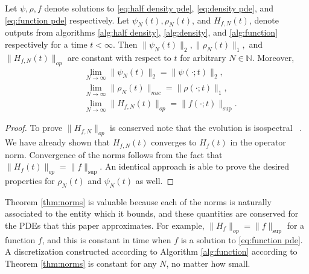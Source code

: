 \documentclass[final,leqno]{siamart}
\begin{document}
\begin{theorem} \label{thm:norms}
	Let $\psi,\rho,f$ denote solutions to \eqref{eq:half density pde}, \eqref{eq:density pde}, and \eqref{eq:function pde} respectively.
	Let $\psi_{N}(t),\rho_{N}(t)$, and $H_{f,N}(t)$, denote outputs from algorithms \ref{alg:half density}, \ref{alg:density}, and \ref{alg:function} respectively for a time $t < \infty$.
	Then $\| \psi_{N} (t)\|_{2}, \|\rho_{N}(t)\|_{1},$ and $\| H_{f,N}(t) \|_{op}$ are constant with respect to $t$ for arbitrary $N \in \mathbb{N}$.
	Moreover,
	\begin{align*}
		&\lim_{N \to \infty} \| \psi_{N} (t) \|_{2} = \| \psi(\cdot; t) \|_{2}, \\
		&\lim_{N \to \infty} \| \rho_{N}(t) \|_{nuc} = \| \rho(\cdot; t) \|_{1}, \\
		&\lim_{N \to \infty} \| H_{f,N}(t) \|_{op} = \| f( \cdot ;t) \|_{\sup}.
	\end{align*}
\end{theorem}
\begin{proof}
	To prove $\| H_{f,N} \|_{op}$ is conserved note that the evolution is isospectral ~\cite{Calvo1997}.
	We have already shown that $H_{f,N}(t)$ converges to $H_{f}(t)$ in the operator norm.
	Convergence of the norms follows from the fact that $\| H_{f}(t) \|_{op} = \| f \|_{\sup}$.
	An identical approach is able to prove the desired properties for $\rho_{N}(t)$ and $\psi_{N}(t)$ as well.
\end{proof}

Theorem \ref{thm:norms} is valuable because each of the norms is naturally associated to the entity which it bounds, and these quantities are conserved for the PDEs that this paper approximates.
For example, $\| H_{f} \|_{op} = \| f \|_{\sup}$ for a function $f$, and this is constant in time when $f$ is a solution to \eqref{eq:function pde}.
A discretization constructed according to Algorithm \ref{alg:function} according to Theorem \ref{thm:norms} is constant for any $N$, no matter how small.
\end{document}
